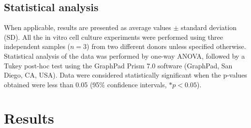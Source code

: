 \subsection{Statistical analysis}
When applicable, results are presented as average values $\pm$ standard deviation (SD). All the in vitro cell culture experiments were performed using three independent samples ($n=3$) from two different donors unless specified otherwise. Statistical analysis of the data was performed by one-way ANOVA, followed by a Tukey post-hoc test using the GraphPad Prism 7.0 software (GraphPad, San Diego, CA, USA). Data were considered statistically significant when the p-values obtained were less than 0.05 (95\si{\percent} confidence intervals, $*p<0.05$). 




\section{Results}


